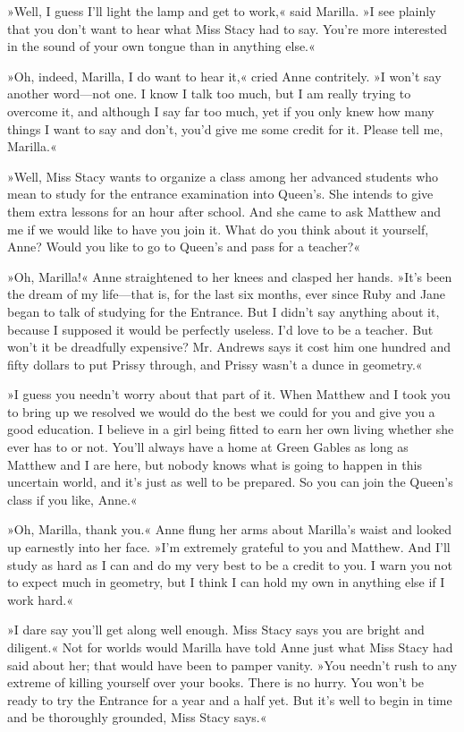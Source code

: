 »Well, I guess I’ll light the lamp and get to work,« said Marilla. »I see plainly that you don’t want to hear what Miss Stacy had to say. You’re more interested in the sound of your own tongue than in anything else.«

»Oh, indeed, Marilla, I do want to hear it,« cried Anne contritely. »I won’t say another word—not one. I know I talk too much, but I am really trying to overcome it, and although I say far too much, yet if you only knew how many things I want to say and don’t, you’d give me some credit for it. Please tell me, Marilla.«

»Well, Miss Stacy wants to organize a class among her advanced students who mean to study for the entrance examination into Queen’s. She intends to give them extra lessons for an hour after school. And she came to ask Matthew and me if we would like to have you join it. What do you think about it yourself, Anne? Would you like to go to Queen’s and pass for a teacher?«

»Oh, Marilla!« Anne straightened to her knees and clasped her hands. »It’s been the dream of my life—that is, for the last six months, ever since Ruby and Jane began to talk of studying for the Entrance. But I didn’t say anything about it, because I supposed it would be perfectly useless. I’d love to be a teacher. But won’t it be dreadfully expensive? Mr. Andrews says it cost him one hundred and fifty dollars to put Prissy through, and Prissy wasn’t a dunce in geometry.«

»I guess you needn’t worry about that part of it. When Matthew and I took you to bring up we resolved we would do the best we could for you and give you a good education. I believe in a girl being fitted to earn her own living whether she ever has to or not. You’ll always have a home at Green Gables as long as Matthew and I are here, but nobody knows what is going to happen in this uncertain world, and it’s just as well to be prepared. So you can join the Queen’s class if you like, Anne.«

»Oh, Marilla, thank you.« Anne flung her arms about Marilla’s waist and looked up earnestly into her face. »I’m extremely grateful to you and Matthew. And I’ll study as hard as I can and do my very best to be a credit to you. I warn you not to expect much in geometry, but I think I can hold my own in anything else if I work hard.«

»I dare say you’ll get along well enough. Miss Stacy says you are bright and diligent.« Not for worlds would Marilla have told Anne just what Miss Stacy had said about her; that would have been to pamper vanity. »You needn’t rush to any extreme of killing yourself over your books. There is no hurry. You won’t be ready to try the Entrance for a year and a half yet. But it’s well to begin in time and be thoroughly grounded, Miss Stacy says.«

